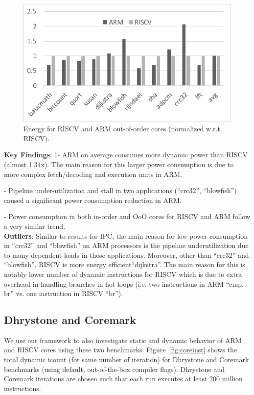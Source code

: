 \begin{figure}[]
	\centering
	\includegraphics[width=1\columnwidth]{figures/energy.pdf}
	\caption{Energy for RISCV and ARM out-of-order cores (normalized w.r.t. RISCV).}
	\label{fig:ener}
	\vspace{-1em}
\end{figure} 

\noindent \textbf{Key Findings}: 1- ARM on average consumes more dynamic power than RISCV (almost 1.34x). The main reason for this larger power consumption is due to more complex fetch/decoding and execution units in ARM. 

- Pipeline under-utilization and stall in two applications (``crc32'', ``blowfish'') caused a significant power consumption reduction in ARM. 

- Power consumption in both in-order and OoO cores for RISCV and ARM follow a very similar trend. \\

\noindent \textbf{Outliers}: Similar to results for IPC, the main reason for low power consumption in ``crc32'' and ``blowfish'' on ARM processors is the pipeline underutilization due to many dependent loads in those applications. Moreover, other than ``crc32'' and ``blowfish'', RISCV is more energy efficient``dijkstra''. The main reason for this is notably lower number of dynamic instructions for RISCV which is due to extra overhead in handling branches in hot loops (i.e. two instructions in ARM ``cmp, br'' vs. one instruction in RISCV ``br'').  

\subsection{Dhrystone and Coremark}
We use our framework to also investigate static and dynamic behavior of ARM and RISCV cores using these two benchmarks. Figure~\ref{fig:coreinst} shows the total dynamic icount (for same number of iteration) for Dhrystone and Coremark benchmarks (using default, out-of-the-box compiler flags). Dhrystone and Coremark iterations are chosen such that each run executes at least 200 million instructions. 

